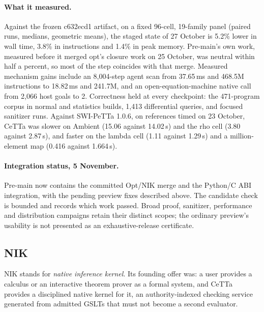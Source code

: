 \documentclass[11pt]{article}
\newcommand{\PeTTa}{\textup{PeTTa}}
\newcommand{\CeTTa}{\textup{CeTTa}}
\begin{document}
\paragraph{What it measured.}  Against the frozen c632ecd1 artifact, on a
fixed 96-cell, 19-family panel (paired runs, medians, geometric means), the
staged state of 27 October is 5.2\% lower in wall time, 3.8\% in instructions
and 1.4\% in peak memory.  Pre-main's own work, measured before it merged
opt's closure work on 25 October, was neutral within half a percent, so most
of the step coincides with that merge.  Measured mechanism gains include an 8{,}004-step agent scan from
37.65\,ms and 468.5M instructions to 18.82\,ms and 241.7M, and an
open-equation-machine native call from 2{,}066 host goals to 2.  Correctness
held at every checkpoint: the 471-program corpus in normal and statistics
builds, 1{,}413 differential queries, and focused sanitizer runs.  Against
SWI-\PeTTa{} 1.0.6, on references timed on 23 October, \CeTTa{} was slower on
Ambient (15.06 against 14.02\,s) and the rho cell (3.80 against 2.87\,s), and
faster on the lambda cell (1.11 against 1.29\,s) and a million-element map
(0.416 against 1.664\,s).

\paragraph{Integration status, 5 November.}  Pre-main now contains the
committed Opt/NIK merge and the Python/C ABI integration, with the pending
preview fixes described above.  The candidate check is bounded and records
which work passed.  Broad proof, sanitizer, performance and distribution
campaigns retain their distinct scopes; the ordinary preview's usability is
not presented as an exhaustive-release certificate.

\subsection{NIK}
\label{sec:line-nik}

NIK stands for \emph{native inference kernel}.  Its founding offer was: a
user provides a calculus or an interactive theorem prover as a formal system,
and \CeTTa{} provides a disciplined native kernel for it, an
authority-indexed checking service generated from admitted GSLTs that must
not become a second evaluator.
\end{document}
